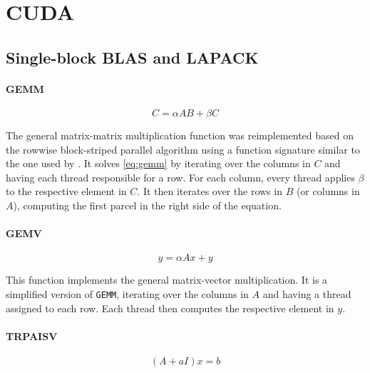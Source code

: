 \documentclass[../thesis]{subfiles}
\begin{document}
	\chapter{CUDA}
	\label{chp:cuda}

	
	
	

	\section{Single-block BLAS and LAPACK}
		\subsubsection{GEMM}

		\begin{equation}
			C = \alpha A B + \beta C
			\label{eq:gemm}
		\end{equation}

		The general matrix-matrix multiplication function was reimplemented based on the rowwise block-striped parallel algorithm \cite[277-281]{Quinn:PP:2003} using a function signature similar to the one used by \mkl. It solves \cref{eq:gemm} by iterating over the columns in $C$ and having each thread responsible for a row. For each column, every thread applies $\beta$ to the respective element in $C$. It then iterates over the rows in $B$ (or columns in $A$), computing the first parcel in the right side of the equation.

		\subsubsection{GEMV}

		\begin{equation}
			y = \alpha A x + y
			\label{eq:gemv}
		\end{equation}

		This function implements the general matrix-vector multiplication. It is a simplified version of \texttt{GEMM}, iterating over the columns in $A$ and having a thread assigned to each row. Each thread then computes the respective element in $y$.

		\subsubsection{TRPAISV}

		\begin{equation}
			(A + aI)x = b
			\label{eq:trpaisv}
		\end{equation}
\end{document}
